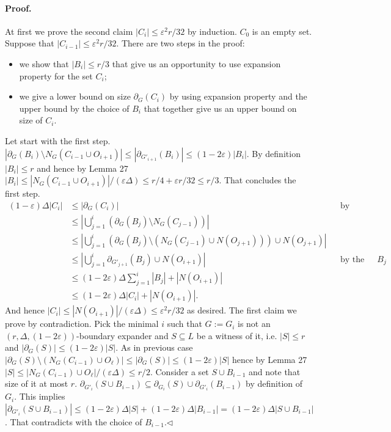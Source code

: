 \documentclass[10pt,a4paper]{article}
\begin{document}
\paragraph{Proof.} At first we prove the second claim $|C_i|\leq\varepsilon^2r/32$ by induction. $C_0$ is an empty set. Suppose that $|C_{i-1}|\leq\varepsilon^2r/32$. There are two steps in the proof:
\begin{itemize}
\item we show that $|B_i|\leq r/3$ that give us an opportunity to use expansion property for the set $C_i$;
\item we give a lower bound on size $\partial_G(C_i)$ by using expansion property and the upper bound by the choice of $B_i$ that together give us an upper bound on size of $C_i$.
\end{itemize}
Let start with the first step. $|\partial_G(B_i)\setminus N_G(C_{i-1}\cup O_{i+1})|\leq|\partial_{G'_{i+1}}(B_i)|\leq(1-2\varepsilon)|B_i|$. By definition $|B_i|\leq r$ and hence by Lemma 27 $|B_i|\leq|N_G(C_{i-1}\cup O_{i+1})|/(\varepsilon\Delta)\leq r/4+\varepsilon r/32\leq r/3$. That concludes the first step.
\begin{align*}
(1-\varepsilon)\Delta|C_i|&\leq|\partial_G(C_i)|&&\text{by expansion}\\
&\leq\left|\bigcup_{j=1}^i(\partial_G(B_j)\setminus N_G(C_{j-1}))\right|\\
&\leq\left|\bigcup_{j=1}^i(\partial_G(B_j)\setminus(N_G(C_{j-1})\cup N(O_{j+1})))\cup N(O_{j+1})\right|\\
&\leq\left|\bigcup_{j=1}^i\partial_{G'_{j+1}}(B_j)\cup N(O_{i+1})\right|&&\text{by the choice of }B_j\\
&\leq(1-2\varepsilon)\Delta\sum_{j=1}^i|B_j|+|N(O_{i+1})|\\
&\leq(1-2\varepsilon)\Delta|C_i|+|N(O_{i+1})|.
\end{align*}
And hence $|C_i|\leq|N(O_{i+1})|/(\varepsilon\Delta)\leq\varepsilon^2r/32$ as desired.
The first claim we prove by contradiction. Pick the minimal $i$ such that $G:=G_i$ is not an $(r,\Delta,(1-2\varepsilon))$-boundary expander and $S\subseteq L$ be a witness of it, i.e. $|S|\leq r$ and $|\partial_G(S)|\leq(1-2\varepsilon)|S|$. As in previous case $|\partial_G(S)\setminus(N_G(C_{i-1})\cup O_\ell)|\leq|\partial_G(S)|\leq(1-2\varepsilon)|S|$ hence by Lemma 27 $|S|\leq|N_G(C_{i-1})\cup O_\ell|/(\varepsilon\Delta)\leq r/2$.
Consider a set $S\cup B_{i-1}$ and note that size of it at most $r$. $\partial_{G'_i}(S\cup B_{i-1})\subseteq\partial_{G_i}(S)\cup\partial_{G'_i}(B_{i-1})$ by definition of $G_i$. This implies $|\partial_{G'_i}(S\cup B_{i-1})|\leq(1-2\varepsilon)\Delta|S|+(1-2\varepsilon)\Delta|B_{i-1}|=(1-2\varepsilon)\Delta|S\cup B_{i-1}|$. That contradicts with the choice of $B_{i-1}$.\hfill$\triangleleft$
\end{document}
